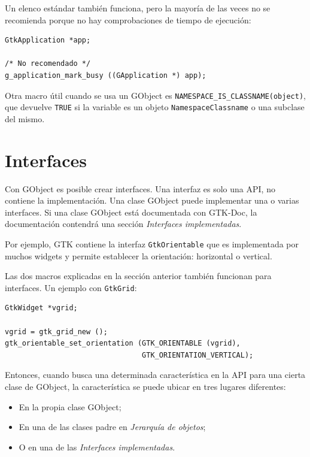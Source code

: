 Un elenco estándar también funciona, pero la mayoría de las veces no se recomienda porque no hay comprobaciones de tiempo de ejecución:

\begin{lstlisting}[style=GLib/GTK]
GtkApplication *app;

/* No recomendado */
g_application_mark_busy ((GApplication *) app);
\end{lstlisting}

Otra macro útil cuando se usa un GObject es \lstinline{NAMESPACE_IS_CLASSNAME(object)}, que devuelve \lstinline{TRUE} si la variable es un objeto \lstinline{NamespaceClassname} o una subclase del mismo.


\section{Interfaces}

Con GObject es posible crear interfaces. Una interfaz es solo una API, no contiene la implementación. Una clase GObject puede implementar una o varias interfaces. Si una clase GObject está documentada con GTK-Doc, la documentación contendrá una sección \emph{Interfaces implementadas}.

Por ejemplo, GTK contiene la interfaz \lstinline{GtkOrientable} que es implementada por muchos widgets y permite establecer la orientación: horizontal o vertical.

Las dos macros explicadas en la sección anterior también funcionan para interfaces. Un ejemplo con \lstinline{GtkGrid}:

\begin{lstlisting}[style=GLib/GTK]
GtkWidget *vgrid;

vgrid = gtk_grid_new ();
gtk_orientable_set_orientation (GTK_ORIENTABLE (vgrid),
                                GTK_ORIENTATION_VERTICAL);
\end{lstlisting}

Entonces, cuando busca una determinada característica en la API para una cierta clase de GObject, la característica se puede ubicar en tres lugares diferentes:
\begin{itemize}
    \item En la propia clase GObject;
    \item En una de las clases padre en \emph{Jerarquía de objetos};
    \item O en una de las \emph{Interfaces implementadas}.
\end{itemize}

